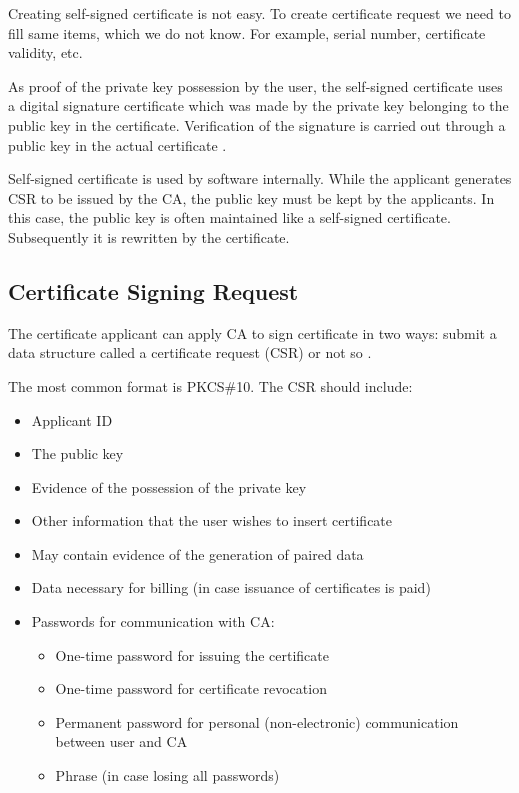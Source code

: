 \documentclass[
  digital, %
  notable,   %
  lof,     %
  lot,     %
]{fithesis3}
\begin{document}
Creating self-signed certificate is not easy. To create certificate request we need to fill 
same items, which we do not know. For example, serial number, certificate validity, etc.

As proof of the private key possession by the user, the self-signed certificate uses a 
digital signature certificate which was made by the private key belonging to the public key 
in the certificate. Verification of the signature is carried out through a public key in the 
actual certificate \cite{dostalek2016velky}.

Self-signed certificate is used by software internally. While the applicant generates CSR to 
be issued by the CA, the public key must be kept by the applicants. In this case, the public 
key is often maintained like a self-signed certificate. Subsequently it is rewritten by the 
certificate.

\subsection{Certificate Signing Request}
The certificate applicant can apply CA to sign certificate in two ways: submit a data structure 
called a certificate request (CSR) or not so \cite{dostalek2016velky}. 

The most common format is PKCS\#10. The CSR should include:
\begin{itemize}[leftmargin=2em,rightmargin=1em,itemsep=0.75\parskip,parsep=0em,topsep=0em,partopsep=0em]
\item Applicant ID
\item The public key
\item Evidence of the possession of the private key
\item Other information that the user wishes to insert certificate
\item May contain evidence of the generation of paired data
\item Data necessary for billing (in case issuance of certificates is paid)
\item Passwords for communication with CA:
  \begin{itemize}[leftmargin=2em,rightmargin=1em,itemsep=0.75\parskip,parsep=0em,topsep=0em,partopsep=0em]
  \item One-time password for issuing the certificate
  \item One-time password for certificate revocation
  \item Permanent password for personal (non-electronic) communication between user and CA
  \item Phrase (in case losing all passwords) 
  \end{itemize}
\end{itemize} 
\end{document}
